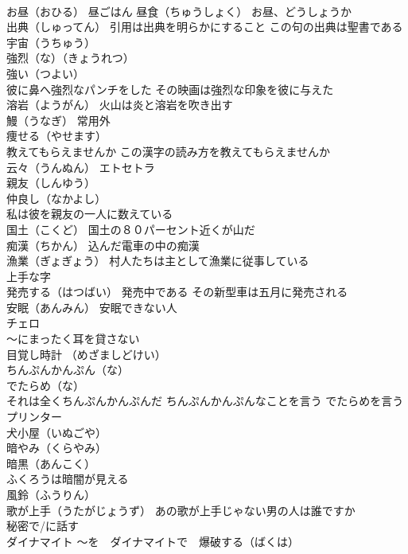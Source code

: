 \documentclass[8pt]{extreport}
\begin{document}
\begin{CJK}{UTF8}{min}
\\	お昼（おひる） 昼ごはん 昼食（ちゅうしょく） お昼、どうしょうか
\\	出典（しゅってん） 引用は出典を明らかにすること この句の出典は聖書である
\\	宇宙（うちゅう）
\\	強烈（な）（きょうれつ）
\\	強い（つよい）
\\	彼に鼻へ強烈なパンチをした その映画は強烈な印象を彼に与えた
\\	溶岩（ようがん） 火山は炎と溶岩を吹き出す
\\	鰻（うなぎ） 常用外
\\	痩せる（やせます）
\\	教えてもらえませんか この漢字の読み方を教えてもらえませんか
\\	云々（うんぬん） エトセトラ
\\	親友（しんゆう）
\\	仲良し（なかよし）
\\	私は彼を親友の一人に数えている
\\	国土（こくど） 国土の８０パーセント近くが山だ
\\	痴漢（ちかん） 込んだ電車の中の痴漢
\\	漁業（ぎょぎょう） 村人たちは主として漁業に従事している
\\	上手な字
\\	発売する（はつばい） 発売中である その新型車は五月に発売される
\\	安眠（あんみん） 安眠できない人
\\	チェロ
\\	～にまったく耳を貸さない
\\	目覚し時計 （めざましどけい）
\\	ちんぷんかんぷん（な）
\\	でたらめ（な）
\\	それは全くちんぷんかんぷんだ ちんぷんかんぷんなことを言う でたらめを言う
\\	プリンター
\\	犬小屋（いぬごや）
\\	暗やみ（くらやみ） 
\\	暗黒（あんこく）　
\\	ふくろうは暗闇が見える
\\	風鈴（ふうりん）
\\	歌が上手（うたがじょうず） あの歌が上手じゃない男の人は誰ですか
\\	秘密で/に話す
\\	ダイナマイト ～を　ダイナマイトで　爆破する（ばくは）

\end{CJK}
\end{document}
